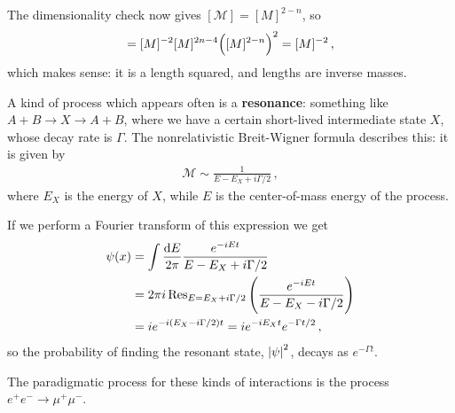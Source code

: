 \documentclass[main.tex]{subfiles}
\begin{document}
The dimensionality check now gives \([\mathcal{M}] = [M]^{2-n}\), so 
%
\begin{align}
[\sigma ] = [M]^{-2} [M]^{2n-4} \qty([M]^{2-n})^2 = [M]^{-2}
\,,
\end{align}
%
which makes sense: it is a length squared, and lengths are inverse masses.

A kind of process which appears often is a \textbf{resonance}: something like \(A+B \to X \to A+B\), where we have a certain short-lived intermediate state \(X\), whose decay rate is \(\Gamma \).
The nonrelativistic Breit-Wigner formula describes this: it is given by 
%
\begin{align}
\mathcal{M} \sim \frac{1}{E - E_X + i \Gamma/ 2}  
\,,
\end{align}
%
where \(E_X\) is the energy of \(X\), while \(E\) is the center-of-mass energy of the process. 

If we perform a Fourier transform of this expression we get 
%
\begin{align}
\psi (x) &=  \int \frac{ \dd{E}}{2 \pi } \frac{e^{-iEt}}{E - E_X + i \Gamma / 2}  \\
&= 2 \pi i \Res_{E = E_X + i \Gamma /2} 
\qty( \frac{e^{-iEt}}{E- E_X - i \Gamma /2}) \\
&= i e^{-i(E_X - i \Gamma /2)t}  = i e^{-iE_X t} e^{-\Gamma t /2}
\,,
\end{align}
%
so the probability of finding the resonant state, \(\abs{\psi }^2\), decays as \(e^{-\Gamma t}\). 

The paradigmatic process for these kinds of interactions is the process \(e^{+}e^{-} \to \mu^{+}\mu^- \). 
\end{document}
